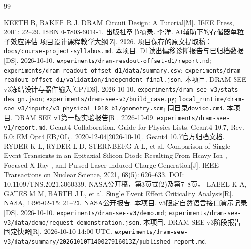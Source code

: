 \documentclass[UTF8,a4paper,zihao=-4,fontset=fandol]{ctexart}
\newcommand{\sourcepath}[1]{{\footnotesize\nolinkurl{#1}}}
\begin{document}
\FloatBarrier
\begin{thebibliography}{99}
\small\raggedright
{} KEETH B, BAKER R J. DRAM Circuit Design: A Tutorial[M]. IEEE Press, 2001: 22--29. ISBN 0-7803-6014-1. \href{https://catalogimages.wiley.com/images/db/pdf/0780360141.excerpt.pdf}{出版社章节摘录}.
 李洋. AI辅助下的存储器单粒子效应评估 项目设计课程教学大纲[Z]. 2026. 项目保存的原文提取稿：\sourcepath{docs/course-project-syllabus.md}.
 本项目. D1读出偏移诊断报告与已归档数据[DS]. 2026-10-10. \sourcepath{experiments/dram-readout-offset-d1/report.md}; \sourcepath{experiments/dram-readout-offset-d1/data/summary.csv}; \sourcepath{experiments/dram-readout-offset-d1/validation/independent-final.json}.
 本项目. DRAM SEE v3冻结设计与器件输入[CP/DS]. 2026-10-10. \sourcepath{experiments/dram-see-v3/stats-design.json}; \sourcepath{experiments/dram-see-v3/build_case.py}; \sourcepath{local_runtime/dram-see-v3/inputs/v3-physical-l018-b1/geometry.scm}; 同目录\texttt{device.cmd}.
 本项目. DRAM SEE v1第一版实验报告[R]. 2026-10-09. \sourcepath{experiments/dram-see-v1/report.md}.
 Geant4 Collaboration. Guide for Physics Lists, Geant4 10.7, Rev. 5.0: EM Opt4[EB/OL]. 2020-12-04[2026-10-10]. \href{https://geant4-userdoc.web.cern.ch/UsersGuides/PhysicsListGuide/BackupVersions/V10.7/html/electromagnetic/Opt4.html}{Geant4 10.7官方归档文档}.
 RYDER K L, RYDER L D, STERNBERG A L, et al. Comparison of Single-Event Transients in an Epitaxial Silicon Diode Resulting From Heavy-Ion-, Focused X-Ray-, and Pulsed Laser-Induced Charge Generation[J]. IEEE Transactions on Nuclear Science, 2021, 68(5): 626--633. DOI: \href{https://doi.org/10.1109/TNS.2021.3060339}{10.1109/TNS.2021.3060339}. \href{https://nepp.nasa.gov/docs/papers/2021-Ryder-TNS-Paper-SET-Epitaxial-Silicon-Diode-20210010229.pdf}{NASA公开稿}，第3页式(2)及第7--8页。
 LABEL K A, GATES M M, BARTH J L, et al. Single Event Effect Criticality Analysis[R]. NASA, 1996-02-15: 21--23. \href{https://nepp.nasa.gov/DocUploads/6D728AF0-2817-4530-97555B6DCB26D083/seecai.pdf}{NASA公开报告}.
 本项目. v3限定自然语言接口演示记录[DS]. 2026-10-10. \sourcepath{experiments/dram-see-v3/demo.md}; \sourcepath{experiments/dram-see-v3/data/demo/request-demonstration.json}.
 本项目. DRAM SEE v3阶段报告 固定快照[R]. 2026-10-10 14:00 UTC. \sourcepath{experiments/dram-see-v3/data/summary/20261010T140027916013Z/published-report.md}.
\end{thebibliography}
\end{document}
